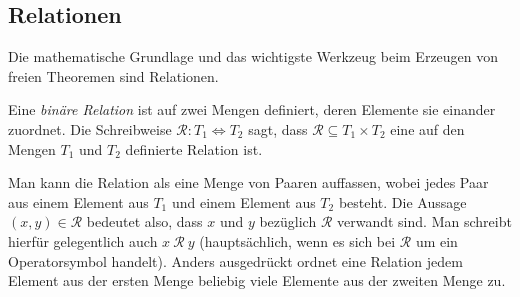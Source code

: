 






\subsection{Relationen}


Die mathematische Grundlage und das wichtigste Werkzeug beim Erzeugen von freien Theoremen sind Relationen.


\begin{mydef}
Eine \textit{binäre Relation} ist auf zwei Mengen definiert, deren Elemente sie einander zuordnet. Die Schreibweise
$\mathcal{R} : T_1 \Leftrightarrow T_2$ sagt, dass $\mathcal{R} \subseteq T_1 \times T_2$ eine auf den Mengen $T_1$ und $T_2$ definierte
Relation ist.
\end{mydef}

Man kann die Relation als eine Menge von Paaren auffassen, wobei jedes Paar aus einem Element aus $T_1$ und einem
Element aus $T_2$ besteht.
Die Aussage $(x, y) \in \mathcal{R}$ bedeutet also, dass $x$ und $y$ bezüglich $\mathcal{R}$ verwandt sind. Man schreibt hierfür
gelegentlich auch $x\ \mathcal{R}\ y$ (hauptsächlich, wenn es sich bei $\mathcal{R}$ um ein Operatorsymbol handelt).
Anders ausgedrückt ordnet eine Relation jedem Element aus der ersten Menge beliebig viele Elemente aus der zweiten Menge zu.


